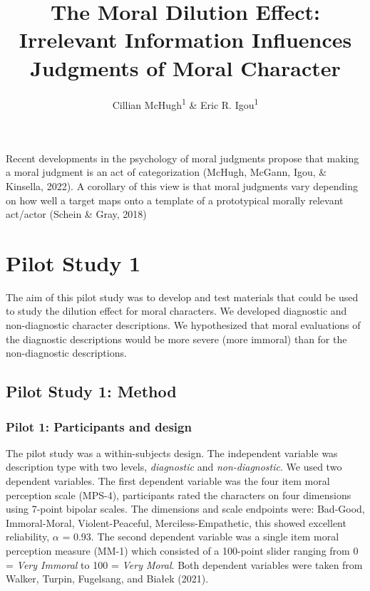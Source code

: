 \documentclass[
  english,
  man,floatsintext]{apa7}
\title{The Moral Dilution Effect: Irrelevant Information Influences Judgments of Moral Character}
\author{Cillian McHugh\textsuperscript{1} \& Eric R. Igou\textsuperscript{1}}
\date{}
\affiliation{\vspace{0.5cm}\textsuperscript{1} University of Limerick}
\begin{document}
\maketitle

Recent developments in the psychology of moral judgments propose that making a moral judgment is an act of categorization (McHugh, McGann, Igou, \& Kinsella, 2022). A corollary of this view is that moral judgments vary depending on how well a target maps onto a template of a prototypical morally relevant act/actor (Schein \& Gray, 2018)

\hypertarget{pilot-study-1}{%
\section{Pilot Study 1}\label{pilot-study-1}}

The aim of this pilot study was to develop and test materials that could be used to study the dilution effect for moral characters. We developed diagnostic and non-diagnostic character descriptions. We hypothesized that moral evaluations of the diagnostic descriptions would be more severe (more immoral) than for the non-diagnostic descriptions.

\hypertarget{pilot-study-1-method}{%
\subsection{Pilot Study 1: Method}\label{pilot-study-1-method}}

\hypertarget{pilot-1-participants-and-design}{%
\subsubsection{Pilot 1: Participants and design}\label{pilot-1-participants-and-design}}

The pilot study was a within-subjects design. The independent variable was description type with two levels, \emph{diagnostic} and \emph{non-diagnostic}. We used two dependent variables. The first dependent variable was the four item moral perception scale (MPS-4), participants rated the characters on four dimensions using 7-point bipolar scales. The dimensions and scale endpoints were: Bad-Good, Immoral-Moral, Violent-Peaceful, Merciless-Empathetic, this showed excellent reliability, \(\alpha\) = 0.93. The second dependent variable was a single item moral perception measure (MM-1) which consisted of a 100-point slider ranging from 0 = \emph{Very Immoral} to 100 = \emph{Very Moral}. Both dependent variables were taken from Walker, Turpin, Fugelsang, and Białek (2021).
\end{document}
